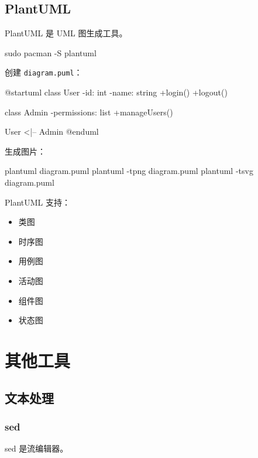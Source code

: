 \subsection{PlantUML}

PlantUML 是 UML 图生成工具。


\begin{lstcode}[numbers=none]
  sudo pacman -S plantuml
\end{lstcode}


创建 \lstinline{diagram.puml}：

\begin{lstcode}[numbers=none]
@startuml
class User {
  -id: int
  -name: string
  +login()
  +logout()
}

class Admin {
  -permissions: list
  +manageUsers()
}

User <|-- Admin
@enduml
\end{lstcode}

生成图片：

\begin{lstcode}[numbers=none]
  plantuml diagram.puml
  plantuml -tpng diagram.puml
  plantuml -tsvg diagram.puml
\end{lstcode}

PlantUML 支持：

\begin{itemize}
  \item 类图
  \item 时序图
  \item 用例图
  \item 活动图
  \item 组件图
  \item 状态图
\end{itemize}

\section{其他工具}

\subsection{文本处理}

\subsubsection{sed}

sed 是流编辑器。

